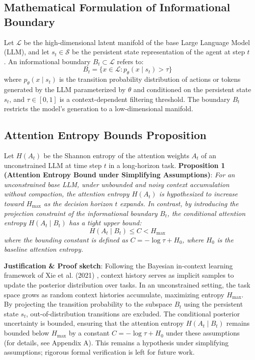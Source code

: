 \documentclass[10pt,journal,compsoc]{IEEEtran}
\begin{document}
\subsection{Mathematical Formulation of Informational Boundary}
Let $\mathcal{L}$ be the high-dimensional latent manifold of the base Large Language Model (LLM), and let $s_t \in \mathcal{S}$ be the persistent state representation of the agent at step $t$. An informational boundary $B_t \subset \mathcal{L}$ refers to:
\begin{equation}
B_t = \{x \in \mathcal{L} : p_\theta(x \mid s_t) > \tau\}
\end{equation}
where $p_\theta(x \mid s_t)$ is the transition probability distribution of actions or tokens generated by the LLM parameterized by $\theta$ and conditioned on the persistent state $s_t$, and $\tau \in [0, 1]$ is a context-dependent filtering threshold. The boundary $B_t$ restricts the model's generation to a low-dimensional manifold.

\subsection{Attention Entropy Bounds Proposition}
Let $H(A_t)$ be the Shannon entropy of the attention weights $A_t$ of an unconstrained LLM at time step $t$ in a long-horizon task.
\textbf{Proposition 1 (Attention Entropy Bound under Simplifying Assumptions)}: \textit{For an unconstrained base LLM, under unbounded and noisy context accumulation without compaction, the attention entropy $H(A_t)$ is hypothesized to increase toward $H_{\max}$ as the decision horizon $t$ expands. In contrast, by introducing the projection constraint of the informational boundary $B_t$, the conditional attention entropy $H(A_t \mid B_t)$ has a tight upper bound:}
\begin{equation}
H(A_t \mid B_t) \le C < H_{\max}
\end{equation}
\textit{where the bounding constant is defined as $C = -\log \tau + H_0$, where $H_0$ is the baseline attention entropy.}

\textbf{Justification \& Proof sketch}: Following the Bayesian in-context learning framework of Xie et al. (2021) \cite[Section~3]{xie2021}, context history serves as implicit samples to update the posterior distribution over tasks. In an unconstrained setting, the task space grows as random context histories accumulate, maximizing entropy $H_{\max}$. By projecting the transition probability to the subspace $B_t$ using the persistent state $s_t$, out-of-distribution transitions are excluded. The conditional posterior uncertainty is bounded, ensuring that the attention entropy $H(A_t \mid B_t)$ remains bounded below $H_{\max}$ by a constant $C = -\log \tau + H_0$ under these assumptions (for details, see Appendix A). This remains a hypothesis under simplifying assumptions; rigorous formal verification is left for future work.
\end{document}
